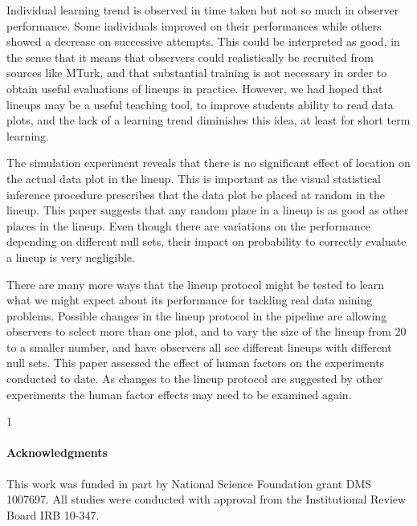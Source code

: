 \documentclass[10pt]{article}\usepackage[]{graphicx}\usepackage[]{xcolor}
\newcommand{\blindDoc}{1}
\begin{document}
Individual learning trend is observed in time taken but not so much in observer performance. Some individuals improved on their performances while others showed a decrease on successive attempts. This could be interpreted as good, in the sense that it means that observers could realistically be recruited from sources like MTurk, and that substantial training is not necessary in order to obtain useful evaluations of lineups in practice. However, we had hoped that lineups may be a useful teaching tool, to improve students ability to read data plots, and the lack of a learning trend diminishes this idea, at least for short term learning. 

The simulation experiment reveals that there is no significant effect of location on the actual data plot in the lineup. This is important as the visual statistical inference procedure prescribes that the data plot be placed at random in the lineup. This paper suggests that any random place in a lineup is as good as other places in the lineup. Even though there are variations on the performance depending on different null sets, their impact on probability to correctly evaluate a lineup is very negligible. 

There are many more ways that the lineup protocol might be tested to learn what we might expect about its performance for tackling real data mining problems. Possible changes in the lineup protocol in the pipeline are allowing observers to select more than one plot, and to vary the size of the lineup from 20 to a smaller number, and have observers all see different lineups with different null sets.  This paper assessed the effect of human factors on the experiments conducted to date. As changes to the lineup protocol are suggested by other experiments the human factor effects may need to be examined again.


\blindDoc
{
\paragraph{Acknowledgments}
This work was funded in part by National Science Foundation grant DMS 1007697. All studies were conducted with approval from the Institutional Review Board IRB 10-347.
} \fi




\end{document}
